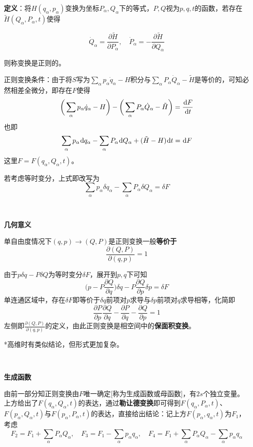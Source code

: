 \documentclass[a4paper,UTF8,fontset=windows]{ctexart}
\newcommand*{\dr}{\hspace{0.07em}\mathrm{d}}
\begin{document}
\textbf{定义}：将$H(q_\alpha,p_\alpha)$变换为坐标$P_\alpha,Q_\alpha$下的等式，$P,Q$视为$p,q,t$的函数，若存在$\tilde{H}(Q_\alpha,P_\alpha,t)$使得

$$\dot{Q}_\alpha=\frac{\partial\tilde{H}}{\partial P_\alpha},\quad\dot{P}_\alpha=-\frac{\partial\tilde{H}}{\partial Q_\alpha}$$

则称变换是正则的。

正则变换条件：由于将$S$写为$\sum_\alpha p_\alpha\dot{q}_\alpha-H$积分与$\sum_\alpha P_\alpha\dot{Q}_\alpha-\tilde{H}$是等价的，可知必然相差全微分，即存在$F$使得
$$\bigg(\sum_\alpha p_\alpha\dot{q}_\alpha-H\bigg)-\bigg(\sum_\alpha P_\alpha\dot{Q}_\alpha-\tilde{H}\bigg)=\frac{\dr F}{\dr t}$$
也即
$$\sum_\alpha p_\alpha\dr q_\alpha-\sum_\alpha P_\alpha\dr Q_\alpha+(\tilde{H}-H)\dr t=\dr F$$
这里$F=F(q_\alpha,Q_\alpha,t)$。

若考虑等时变分，上式即改写为
$$\sum_\alpha p_\alpha\delta q_\alpha-\sum_\alpha P_\alpha\delta Q_\alpha=\delta F$$

\

\textbf{几何意义}

单自由度情况下$(q,p)\to(Q,P)$是正则变换一般\textbf{等价于}
$$\frac{\partial(Q,P)}{\partial(q,p)}=1$$

由于$p\delta q-P\delta Q$为等时变分$\delta F$，展开到$p,q$下可知
$$\bigg(p-P\frac{\partial Q}{\partial q}\bigg)\delta q-P\frac{\partial Q}{\partial p}\delta p=\delta F$$
单连通区域中，存在$\delta F$即等价于$\delta q$前项对$p$求导与$\delta p$前项对$q$求导相等，化简即
$$\frac{\partial P}{\partial p}\frac{\partial Q}{\partial q}-\frac{\partial P}{\partial q}-\frac{\partial Q}{\partial p}=1$$
左侧即$\frac{\partial(Q,P)}{\partial(q,p)}$的定义，由此正则变换是相空间中的\textbf{保面积变换}。

*高维时有类似结论，但形式更加复杂。

\

\textbf{生成函数}

由前一部分知正则变换由$F$唯一确定[称为生成函数或母函数]，有$2s$个独立变量。上方给出了$F(q_\alpha,Q_\alpha,t)$的表达，通过\textbf{勒让德变换}即可得到$F(q_\alpha,P_\alpha,t)$、$F(p_\alpha,Q_\alpha,t)$与$F(p_\alpha,P_\alpha,t)$的表达，直接给出结论：记上方$F(p_\alpha,q_\alpha,t)$为$F_1$，考虑
$$F_2=F_1+\sum_\alpha P_\alpha Q_\alpha,\quad F_3=F_1-\sum_\alpha p_\alpha q_\alpha,\quad F_4=F_1+\sum_\alpha P_\alpha Q_\alpha-\sum_\alpha p_\alpha q_\alpha$$
\end{document}
